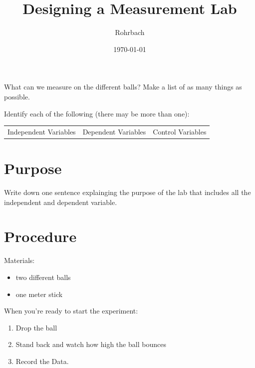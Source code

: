\documentclass[10pt]{exam}
\title{Designing a Measurement Lab}
\author{Rohrbach}
\date{\today}
\begin{document}
\maketitle

\vspace{-2em}
\begin{questions}
  
    \question
      What can we measure on the different balls?  Make 
      a list of as many things as possible. 
      \vs[3]

    \question
      Identify each of the following (there may be more 
      than one):
      
      \begin{center}
        \begin{tabular}
          { m{} | m{}| m{} } 
          Independent Variables & 
          Dependent Variables   & 
          Control Variables  \\[8em]
        \end{tabular}
      \end{center}
    
  
\end{questions}

\section*{Purpose}
Write down one sentence explainging the purpose of the lab that includes all the independent and dependent variable.
\vs[2]

\section*{Procedure}

Materials:

\begin{itemize}[topsep=0pt,itemsep=-1ex,partopsep=1ex,parsep=1ex]
  \item two different balls
  \item one meter stick
\end{itemize}


\noindent When you're ready to start the experiment:

\begin{enumerate}[topsep=0pt,itemsep=-1ex,partopsep=1ex,parsep=1ex]
  \item Drop the ball
  \item Stand back and watch how high the ball bounces
  \item Record the Data.
\end{enumerate}
\end{document}
